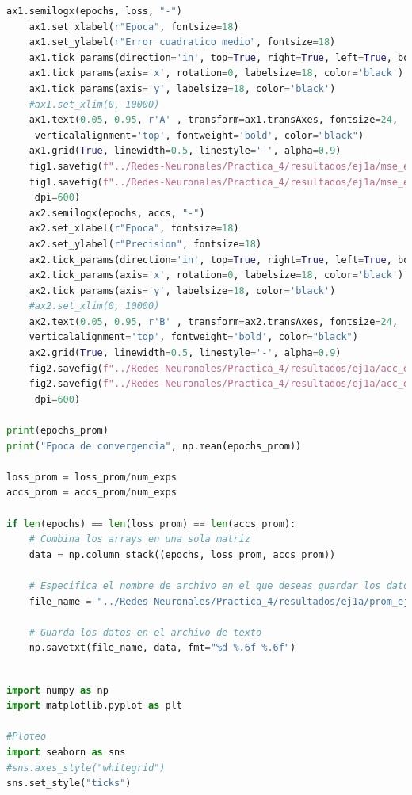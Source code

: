 \documentclass[11pt,twocolumn,twoside]{opticajnl}
\begin{document}
\begin{onecolumn}
\begin{lstlisting}[language=Python, caption={Ejercicio 1 - Arquitectura 2-2-1}, label=ej1]
    ax1.semilogx(epochs, loss, "-")
    ax1.set_xlabel(r"Epoca", fontsize=18)
    ax1.set_ylabel(r"Error cuadratico medio", fontsize=18)
    ax1.tick_params(direction='in', top=True, right=True, left=True, bottom=True)
    ax1.tick_params(axis='x', rotation=0, labelsize=18, color='black')
    ax1.tick_params(axis='y', labelsize=18, color='black')
    #ax1.set_xlim(0, 10000)
    ax1.text(0.05, 0.95, r'A' , transform=ax1.transAxes, fontsize=24,
     verticalalignment='top', fontweight='bold', color="black")
    ax1.grid(True, linewidth=0.5, linestyle='-', alpha=0.9)
    fig1.savefig(f"../Redes-Neuronales/Practica_4/resultados/ej1a/mse_ej1a.pdf")
    fig1.savefig(f"../Redes-Neuronales/Practica_4/resultados/ej1a/mse_ej1a.png",
     dpi=600)
    ax2.semilogx(epochs, accs, "-")
    ax2.set_xlabel(r"Epoca", fontsize=18)
    ax2.set_ylabel(r"Precision", fontsize=18)
    ax2.tick_params(direction='in', top=True, right=True, left=True, bottom=True)
    ax2.tick_params(axis='x', rotation=0, labelsize=18, color='black')
    ax2.tick_params(axis='y', labelsize=18, color='black')
    #ax2.set_xlim(0, 10000)
    ax2.text(0.05, 0.95, r'B' , transform=ax2.transAxes, fontsize=24, 
    verticalalignment='top', fontweight='bold', color="black")
    ax2.grid(True, linewidth=0.5, linestyle='-', alpha=0.9)
    fig2.savefig(f"../Redes-Neuronales/Practica_4/resultados/ej1a/acc_ej1a.pdf")
    fig2.savefig(f"../Redes-Neuronales/Practica_4/resultados/ej1a/acc_ej1a.png",
     dpi=600)

print(epochs_prom)
print("Epoca de convergencia", np.mean(epochs_prom))

loss_prom = loss_prom/num_exps
accs_prom = accs_prom/num_exps

if len(epochs) == len(loss_prom) == len(accs_prom):
    # Combina los arrays en una sola matriz
    data = np.column_stack((epochs, loss_prom, accs_prom))

    # Especifica el nombre de archivo en el que deseas guardar los datos
    file_name = "../Redes-Neuronales/Practica_4/resultados/ej1a/prom_ej1a.txt"

    # Guarda los datos en el archivo de texto
    np.savetxt(file_name, data, fmt="%d %.6f %.6f")
\end{lstlisting}
\begin{lstlisting}[language=Python, caption={Ejercicio 1 - Arquitectura 2-1-1}, label=ej1b]

import numpy as np
import matplotlib.pyplot as plt

#Ploteo 
import seaborn as sns
#sns.axes_style("whitegrid")
sns.set_style("ticks")


\end{lstlisting}
\end{onecolumn}
\end{document}
